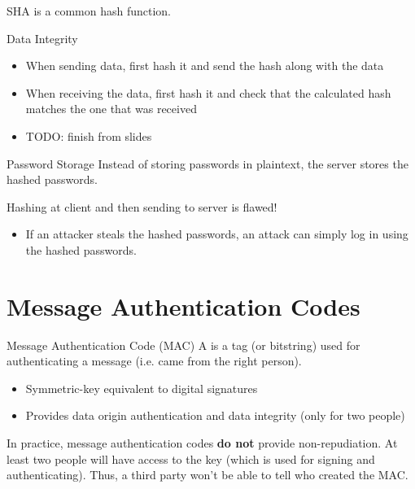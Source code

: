 \documentclass[code]{amznotes}
\begin{document}
\begin{dfnbox}{SHA}{}
     is a common hash function.
\end{dfnbox}

\begin{exbox}{Data Integrity}{}
    \begin{itemize}
        \item When sending data, first hash it and send the hash along with the data
        \item When receiving the data, first hash it and check that the calculated hash matches the one that was received
        \item TODO: finish from slides
    \end{itemize}
\end{exbox}

\begin{exbox}{Password Storage}{}
    Instead of storing passwords in plaintext, the server stores the hashed passwords.

    Hashing at client and then sending to server is flawed!
    \begin{itemize}
        \item If an attacker steals the hashed passwords, an attack can simply log in using the hashed passwords.
    \end{itemize}
\end{exbox}

\section{Message Authentication Codes}

\begin{dfnbox}{Message Authentication Code (MAC)}{}
    A  is a tag (or bitstring) used for authenticating a message (i.e. came from the right person).
\end{dfnbox}

\begin{itemize}[noitemsep]
    \item Symmetric-key equivalent to digital signatures
    \item Provides data origin authentication and data integrity (only for two people)
\end{itemize}

In practice, message authentication codes \textbf{do not} provide non-repudiation. At least two people will have access to the key (which is used for signing and authenticating). Thus, a third party won't be able to tell who created the MAC.
\end{document}
